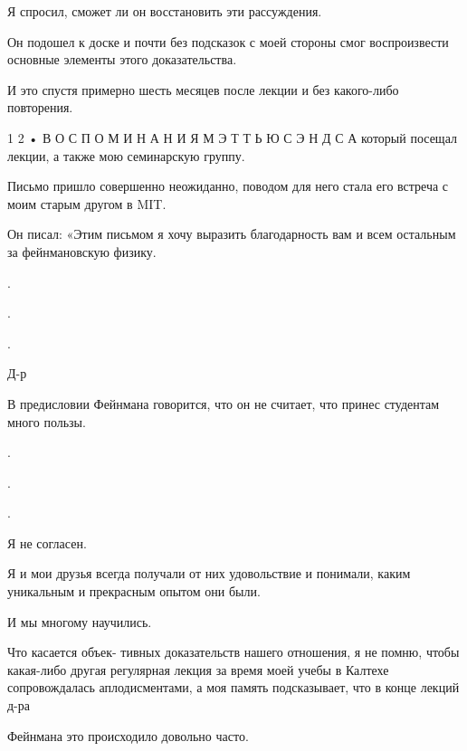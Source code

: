 \documentclass[10pt,oneside]{article}
\begin{document}
Я спросил, сможет ли он восстановить эти рассуждения.\par

Он подошел к доске и почти без подсказок с моей стороны смог воспроизвести основные элементы этого доказательства.\par

И это спустя примерно шесть месяцев после лекции и без какого-либо повторения.\par

1 2 • В О С П О М И Н А Н И Я  М Э Т Т Ь Ю  С Э Н Д С А который посещал лекции, а также мою семинарскую группу.\par

Письмо пришло совершенно неожиданно, поводом для него стала его встреча с моим старым другом в MIT.\par

Он писал: «Этим письмом я хочу выразить благодарность вам и всем остальным за фейнмановскую физику.\par

.\par

.\par

.\par

Д-р\par

В предисловии Фейнмана говорится, что он не считает, что принес студентам много пользы.\par

.\par

.\par

.\par

Я не согласен.\par

Я и мои друзья всегда получали от них удовольствие и понимали, каким уникальным и прекрасным опытом они были.\par

И мы многому научились.\par

Что касается объек- тивных доказательств нашего отношения, я не помню, чтобы какая-либо другая регулярная лекция за время моей учебы в Калтехе сопровождалась аплодисментами, а моя память подсказывает, что в конце лекций д-ра\par

Фейнмана это происходило довольно часто.\par
\end{document}
